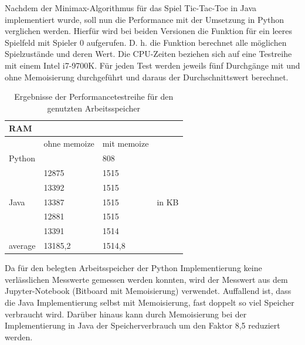 Nachdem der Minimax-Algorithmus für das Spiel Tic-Tac-Toe in Java implementiert wurde, soll nun die 
Performance mit der Umsetzung in Python verglichen werden. Hierfür wird bei beiden Versionen die Funktion 
 für ein leeres Spielfeld mit Spieler 0 aufgerufen. D. h. die Funktion  berechnet 
alle möglichen Spielzustände und deren Wert. Die CPU-Zeiten beziehen sich auf eine Testreihe mit einem 
Intel i7-9700K. Für jeden Test werden jeweils fünf Durchgänge mit und ohne Memoisierung durchgeführt 
und daraus der Durchschnittswert berechnet.

\begin{table}[H]
    \centering
    \begin{tabular}{|l|ll|l|}
        \hline
        \multicolumn{4}{|l|}{\textbf{RAM}}                                             \\ \hline
                                & ohne memoize & mit memoize &                         \\ \hline
        \multirow{1}{*}{Python} &              & 808         & \multirow{7}{*}{in KB}  \\ \cline{1-3}
        \multirow{5}{*}{Java}   & 12875        & 1515        &                         \\
                                & 13392        & 1515        &                         \\
                                & 13387        & 1515        &                         \\
                                & 12881        & 1515        &                         \\
                                & 13391        & 1514        &                         \\ \cline{1-3}
        average                 & 13185,2      & 1514,8      &                         \\ \hline
    \end{tabular}
    \caption{Ergebnisse der Performancetestreihe für den genutzten Arbeitsspeicher}
\end{table}

Da für den belegten Arbeitsspeicher der Python Implementierung keine verlässlichen Messwerte gemessen werden 
konnten, wird der Messwert aus dem Jupyter-Notebook (Bitboard mit Memoisierung) verwendet. Auffallend ist, 
dass die Java Implementierung selbst mit Memoisierung, fast doppelt so viel Speicher verbraucht wird. 
Darüber hinaus kann durch Memoisierung bei der Implementierung in Java der Speicherverbrauch um den 
Faktor 8,5 reduziert werden.

